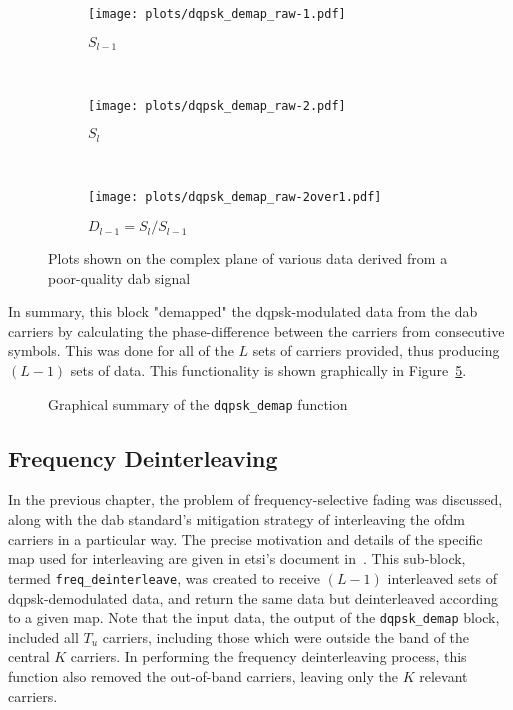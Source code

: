 \documentclass[class=report,11pt,crop=false]{standalone}
\begin{document}
\begin{figure}[htbp]
  \centering
  \captionsetup{type=figure}
  \begin{subfigure}[t]{0.3\textwidth}
    \centering
    \captionsetup{type=figure}
    \texttt{[image: plots/dqpsk\_demap\_raw-1.pdf]}
    \caption{\(S_{l-1}\)}
    \label{fig:dqpsk_demap_raw-1}
  \end{subfigure}%
  ~ 
  \begin{subfigure}[t]{0.3\textwidth}
    \centering
    \captionsetup{type=figure}
    \texttt{[image: plots/dqpsk\_demap\_raw-2.pdf]}
    \caption{\(S_{l}\)}
    \label{fig:dqpsk_demap_raw-2}
  \end{subfigure}
  ~ 
  \begin{subfigure}[t]{0.3\textwidth}
    \centering
    \captionsetup{type=figure}
    \texttt{[image: plots/dqpsk\_demap\_raw-2over1.pdf]}
    \caption{\(D_{l-1} = S_{l}/S_{l-1}\)}
    \label{fig:dqpsk_demap_raw-2over1}
  \end{subfigure}
  \caption{Plots shown on the complex plane of various data derived from a poor-quality \gls{dab} signal}
  \label{fig:dqpsk_demap_raw}
\end{figure}

In summary, this block "demapped" the \gls{dqpsk}-modulated data from the \gls{dab} carriers by calculating the phase-difference between the carriers from consecutive symbols. This was done for all of the \(L\) sets of carriers provided, thus producing \((L-1)\) sets of data. This functionality is shown graphically in Figure~\ref{fig:dqpsk_demap}.

\begin{figure}[htbp]
  \centering
  \captionsetup{type=figure}
  \def\svgwidth{\linewidth}
  { %
      }
      \caption{Graphical summary of the \texttt{dqpsk\_demap} function}
  \label{fig:dqpsk_demap}
\end{figure}

\subsection{Frequency Deinterleaving \label{subsect:dab-proc_freq-deinterleave}}
In the previous chapter, the problem of frequency-selective fading was discussed, along with the \gls{dab} standard's mitigation strategy of interleaving the \gls{ofdm} carriers in a particular way. The precise motivation and details of the specific map used for interleaving are given in \gls{etsi}'s document in~\cite{dabstandard}. This sub-block, termed \texttt{freq\_deinterleave}, was created to receive \((L-1)\) interleaved sets of \gls{dqpsk}-demodulated data, and return the same data but deinterleaved according to a given map. Note that the input data, the output of the \texttt{dqpsk\_demap} block, included all \(T_u\) carriers, including those which were outside the band of the central \(K\) carriers. In performing the frequency deinterleaving process, this function also removed the out-of-band carriers, leaving only the \(K\) relevant carriers.
\end{document}
